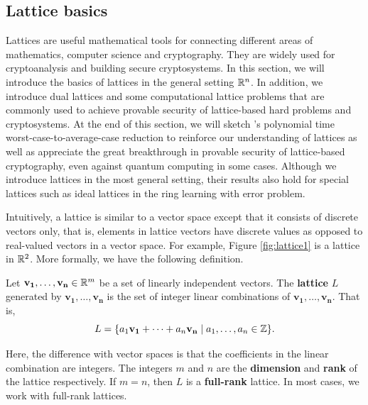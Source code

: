 \documentclass[../main.tex]{subfiles}
\begin{document}
\label{section:lattice theory}

\subsection{Lattice basics}




Lattices are useful mathematical tools for connecting different areas of mathematics, computer science and cryptography. They are widely used for cryptoanalysis and building secure cryptosystems. In this section, we will introduce the basics of lattices in the general setting $\mathbb{R}^n$. In addition, we introduce dual lattices and some computational lattice problems that are commonly used to achieve provable security of lattice-based hard problems and cryptosystems. At the end of this section, we will sketch \citet{ajtai1996generating}'s polynomial time worst-case-to-average-case reduction to reinforce our understanding of lattices as well as appreciate the great breakthrough in provable security of lattice-based cryptography, even against quantum computing in some cases. Although we introduce lattices in the most general setting, their results also hold for special lattices such as ideal lattices in the ring learning with error problem. 

Intuitively, a lattice is similar to a vector space except that it consists of discrete vectors only, that is, elements in lattice vectors have discrete values as opposed to real-valued vectors in a vector space. For example, Figure \ref{fig:lattice1} is a lattice in $\mathbb{R}^2$. More formally, we have the following definition. 

\begin{definition}
Let $\mathbf{v_1}, \dots, \mathbf{v_n} \in \mathbb{R}^m$ be a set of linearly independent vectors. The \textbf{lattice}  $L$
\reversemarginpar
{}
generated by $\mathbf{v_1}, \dots, \mathbf{v_n}$ is the set of integer linear combinations of $\mathbf{v_1}, \dots, \mathbf{v_n}$. That is, 
\begin{equation*}
    L = \{a_1 \mathbf{v_1} + \cdots + a_n \mathbf{v_n} \mid a_1, \dots, a_n \in \mathbb{Z}\}.
\end{equation*}
\end{definition}
Here, the difference with vector spaces is that the coefficients in the linear combination are integers. The integers $m$ and $n$ are the \textbf{dimension} and \textbf{rank} 
\reversemarginpar
{}
of the lattice respectively. If $m=n$, then $L$ is a \textbf{full-rank} lattice. In most cases, we work with full-rank lattices. 
\end{document}
